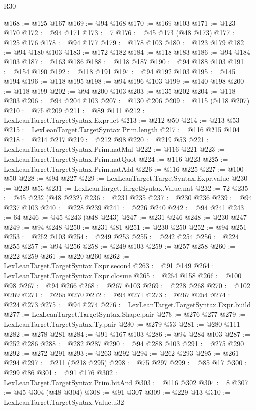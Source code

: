 \begin{lexlean}{R30}
\begin{coremodule}
@168 := @125 @167
@169 := @94 @168
@170 := @169 @103
@171 := @123 @170
@172 := @94 @171
@173 := 7
@176 := @45 @173 (@48 @173)
@177 := @125 @176
@178 := @94 @177
@179 := @178 @103
@180 := @123 @179
@182 := @94 @180 @103
@183 := @172 @182
@184 := @118 @183
@186 := @94 @184 @103
@187 := @163 @186
@188 := @118 @187
@190 := @94 @188 @103
@191 := @154 @190
@192 := @118 @191
@194 := @94 @192 @103
@195 := @145 @194
@196 := @118 @195
@198 := @94 @196 @103
@199 := @140 @198
@200 := @118 @199
@202 := @94 @200 @103
@203 := @135 @202
@204 := @118 @203
@206 := @94 @204 @103
@207 := @130 @206
@209 := @115 (@118 @207)
@210 := @75 @209
@211 := @89 @111
@212 := LexLeanTarget.TargetSyntax.Expr.let
@213 := @212 @50
@214 := @213 @53
@215 := LexLeanTarget.TargetSyntax.Prim.length
@217 := @116 @215 @104
@218 := @214 @217
@219 := @212 @98
@220 := @219 @53
@221 := LexLeanTarget.TargetSyntax.Prim.natMul
@222 := @116 @221
@223 := LexLeanTarget.TargetSyntax.Prim.natQuot
@224 := @116 @223
@225 := LexLeanTarget.TargetSyntax.Prim.natAdd
@226 := @116 @225
@227 := @100 @50
@228 := @94 @227
@229 := LexLeanTarget.TargetSyntax.Expr.value
@230 := @229 @53
@231 := LexLeanTarget.TargetSyntax.Value.nat
@232 := 72
@235 := @45 @232 (@48 @232)
@236 := @231 @235
@237 := @230 @236
@239 := @94 @237 @103
@240 := @228 @239
@241 := @226 @240
@242 := @94 @241
@243 := 64
@246 := @45 @243 (@48 @243)
@247 := @231 @246
@248 := @230 @247
@249 := @94 @248
@250 := @231 @81
@251 := @230 @250
@252 := @94 @251
@253 := @252 @103
@254 := @249 @253
@255 := @242 @254
@256 := @224 @255
@257 := @94 @256
@258 := @249 @103
@259 := @257 @258
@260 := @222 @259
@261 := @220 @260
@262 := LexLeanTarget.TargetSyntax.Expr.second
@263 := @91 @149
@264 := LexLeanTarget.TargetSyntax.Expr.closure
@265 := @264 @158
@266 := @100 @98
@267 := @94 @266
@268 := @267 @103
@269 := @228 @268
@270 := @102 @269
@271 := @265 @270
@272 := @94 @271
@273 := @267 @254
@274 := @224 @273
@275 := @94 @274
@276 := LexLeanTarget.TargetSyntax.Expr.build
@277 := LexLeanTarget.TargetSyntax.Shape.pair
@278 := @276 @277
@279 := LexLeanTarget.TargetSyntax.Ty.pair
@280 := @279 @53
@281 := @280 @111
@282 := @278 @281
@284 := @91 @167 @103
@286 := @94 @284 @103
@287 := @252 @286
@288 := @282 @287
@290 := @94 @288 @103
@291 := @275 @290
@292 := @272 @291
@293 := @263 @292
@294 := @262 @293
@295 := @261 @294
@297 := @211 (@218 @295)
@298 := @75 @297
@299 := @85 @17
@300 := @299 @86
@301 := @91 @176
@302 := LexLeanTarget.TargetSyntax.Prim.bitAnd
@303 := @116 @302
@304 := 8
@307 := @45 @304 (@48 @304)
@308 := @91 @307
@309 := @229 @13
@310 := LexLeanTarget.TargetSyntax.Value.u32

\end{coremodule}
\end{lexlean}
